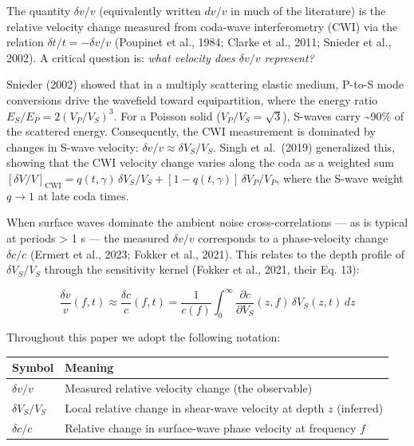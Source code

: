 \documentclass[12pt]{article}
\newcounter{none}
\begin{document}
The quantity \(\delta v/v\) (equivalently written \(dv/v\) in much of
the literature) is the relative velocity change measured from coda-wave
interferometry (CWI) via the relation \(\delta t/t = -\delta v/v\)
(Poupinet et al., 1984; Clarke et al., 2011; Snieder et al., 2002). A
critical question is: \emph{what velocity does \(\delta v/v\)
represent?}

Snieder (2002) showed that in a multiply scattering elastic medium,
P-to-S mode conversions drive the wavefield toward equipartition, where
the energy ratio \(E_S/E_P = 2(V_P/V_S)^3\). For a Poisson solid
(\(V_P/V_S = \sqrt{3}\)), S-waves carry \textasciitilde{}90\% of the
scattered energy. Consequently, the CWI measurement is dominated by
changes in S-wave velocity: \(\delta v/v \approx \delta V_S/V_S\). Singh
et al.~(2019) generalized this, showing that the CWI velocity change
varies along the coda as a weighted sum
\([\delta V/V]_{\text{CWI}} = q(t,\gamma)\,\delta V_S/V_S + [1-q(t,\gamma)]\,\delta V_P/V_P\),
where the S-wave weight \(q \to 1\) at late coda times.

When surface waves dominate the ambient noise cross-correlations --- as
is typical at periods \textgreater{} 1 s --- the measured \(\delta v/v\)
corresponds to a phase-velocity change \(\delta c/c\) (Ermert et al.,
2023; Fokker et al., 2021). This relates to the depth profile of
\(\delta V_S / V_S\) through the sensitivity kernel (Fokker et al.,
2021, their Eq. 13):

\[\frac{\delta v}{v}(f, t) \approx \frac{\delta c}{c}(f, t) = \frac{1}{c(f)} \int_0^\infty \frac{\partial c}{\partial V_S}(z, f) \, \delta V_S(z, t) \, dz \tag{1}\]

Throughout this paper we adopt the following notation:

{\def\LTcaptype{none} %
\begin{longtable}[]{@{}
  >{\raggedright\arraybackslash}p{}
  >{\raggedright\arraybackslash}p{}@{}}
\toprule\noalign{}
\begin{minipage}[b]{\linewidth}\raggedright
Symbol
\end{minipage} & \begin{minipage}[b]{\linewidth}\raggedright
Meaning
\end{minipage} \\
\midrule\noalign{}
\endhead
\bottomrule\noalign{}
\endlastfoot
\(\delta v / v\) & Measured relative velocity change (the observable) \\
\(\delta V_S / V_S\) & Local relative change in shear-wave velocity at
depth \(z\) (inferred) \\
\(\delta c / c\) & Relative change in surface-wave phase velocity at
frequency \(f\) \\
\end{longtable}
}
\end{document}
